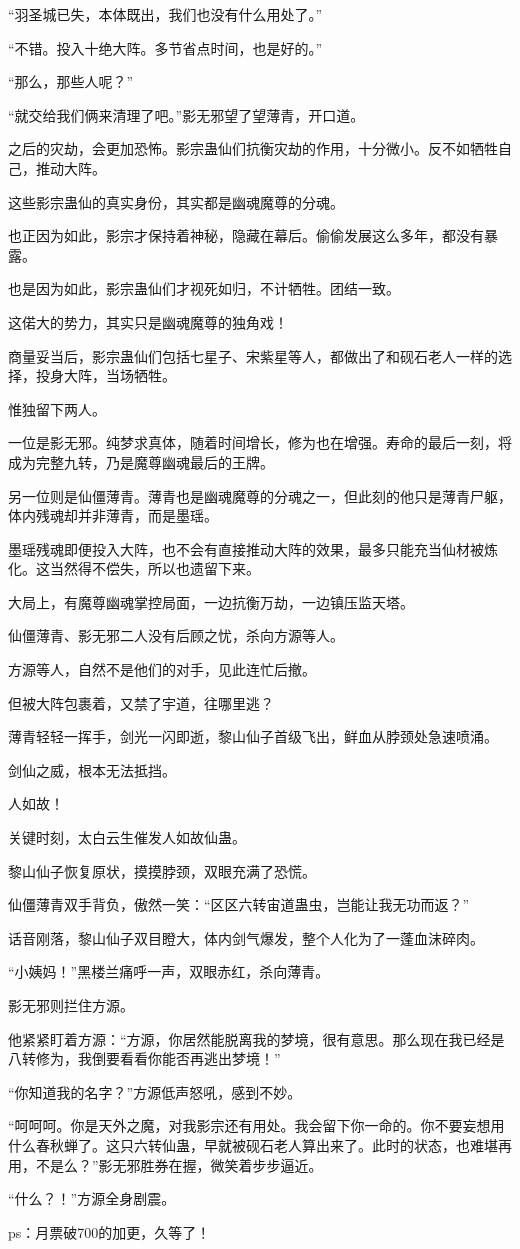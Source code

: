 \begin{this_body}
“羽圣城已失，本体既出，我们也没有什么用处了。”

“不错。投入十绝大阵。多节省点时间，也是好的。”

“那么，那些人呢？”

“就交给我们俩来清理了吧。”影无邪望了望薄青，开口道。

之后的灾劫，会更加恐怖。影宗蛊仙们抗衡灾劫的作用，十分微小。反不如牺牲自己，推动大阵。

这些影宗蛊仙的真实身份，其实都是幽魂魔尊的分魂。

也正因为如此，影宗才保持着神秘，隐藏在幕后。偷偷发展这么多年，都没有暴露。

也是因为如此，影宗蛊仙们才视死如归，不计牺牲。团结一致。

这偌大的势力，其实只是幽魂魔尊的独角戏！

商量妥当后，影宗蛊仙们包括七星子、宋紫星等人，都做出了和砚石老人一样的选择，投身大阵，当场牺牲。

惟独留下两人。

一位是影无邪。纯梦求真体，随着时间增长，修为也在增强。寿命的最后一刻，将成为完整九转，乃是魔尊幽魂最后的王牌。

另一位则是仙僵薄青。薄青也是幽魂魔尊的分魂之一，但此刻的他只是薄青尸躯，体内残魂却并非薄青，而是墨瑶。

墨瑶残魂即便投入大阵，也不会有直接推动大阵的效果，最多只能充当仙材被炼化。这当然得不偿失，所以也遗留下来。

大局上，有魔尊幽魂掌控局面，一边抗衡万劫，一边镇压监天塔。

仙僵薄青、影无邪二人没有后顾之忧，杀向方源等人。

方源等人，自然不是他们的对手，见此连忙后撤。

但被大阵包裹着，又禁了宇道，往哪里逃？

薄青轻轻一挥手，剑光一闪即逝，黎山仙子首级飞出，鲜血从脖颈处急速喷涌。

剑仙之威，根本无法抵挡。

人如故！

关键时刻，太白云生催发人如故仙蛊。

黎山仙子恢复原状，摸摸脖颈，双眼充满了恐慌。

仙僵薄青双手背负，傲然一笑：“区区六转宙道蛊虫，岂能让我无功而返？”

话音刚落，黎山仙子双目瞪大，体内剑气爆发，整个人化为了一蓬血沫碎肉。

“小姨妈！”黑楼兰痛呼一声，双眼赤红，杀向薄青。

影无邪则拦住方源。

他紧紧盯着方源：“方源，你居然能脱离我的梦境，很有意思。那么现在我已经是八转修为，我倒要看看你能否再逃出梦境！”

“你知道我的名字？”方源低声怒吼，感到不妙。

“呵呵呵。你是天外之魔，对我影宗还有用处。我会留下你一命的。你不要妄想用什么春秋蝉了。这只六转仙蛊，早就被砚石老人算出来了。此时的状态，也难堪再用，不是么？”影无邪胜券在握，微笑着步步逼近。

“什么？！”方源全身剧震。

ps：月票破700的加更，久等了！

\end{this_body}

